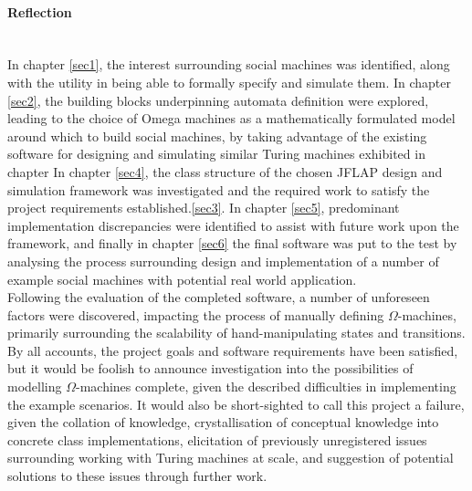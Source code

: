 \documentclass[12pt]{article}
\begin{document}
	\paragraph{Reflection}\hfill\\
		In chapter \ref{sec1}, the interest surrounding social machines was identified, along with the utility in being able to formally specify and simulate them.
		In chapter \ref{sec2}, the building blocks underpinning automata definition were explored, leading to the choice of Omega machines as a mathematically formulated model around which to build social machines, by taking advantage of the existing software for designing and simulating similar Turing machines exhibited in chapter 
		In chapter \ref{sec4}, the class structure of the chosen JFLAP design and simulation framework was investigated and the required work to satisfy the project requirements established.\ref{sec3}.
		In chapter \ref{sec5}, predominant implementation discrepancies were identified to assist with future work upon the framework, and finally in chapter \ref{sec6} the final software was put to the test by analysing the process surrounding design and implementation of a number of example social machines with potential real world application.\\
		Following the evaluation of the completed software, a number of unforeseen factors were discovered, impacting the process of manually defining $\Omega$-machines, primarily surrounding the scalability of hand-manipulating states and transitions.
		By all accounts, the project goals and software requirements have been satisfied, but it would be foolish to announce investigation into the possibilities of modelling $\Omega$-machines complete, given the described difficulties in  implementing the example scenarios.
		It would also be short-sighted to call this project a failure, given the collation of knowledge, crystallisation of conceptual knowledge into concrete class implementations, elicitation of previously unregistered issues surrounding working with Turing machines at scale, and suggestion of potential solutions to these issues through further work.
	
\end{document}
